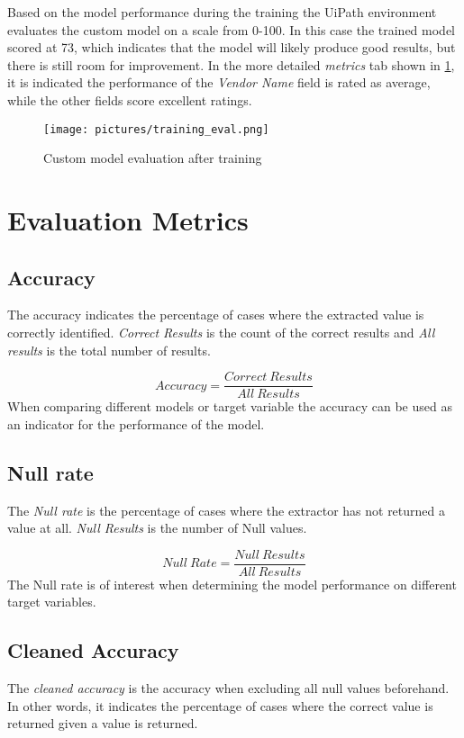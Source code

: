 Based on the model performance during the training the UiPath environment evaluates the custom model on a scale from 0-100. In this case the trained model scored at 73, which indicates that the model will likely produce good results, but there is still room for improvement. In the more detailed \textit{metrics} tab shown in \cref{fig:train-eval}, it is indicated the performance of the \textit{Vendor Name} field is rated as average, while the other fields score excellent ratings.

\begin{figure}
    \centering
    \texttt{[image: pictures/training\_eval.png]}
    \caption{Custom model evaluation after training}
    \label{fig:train-eval}
\end{figure}

\section{Evaluation Metrics}
\subsection{Accuracy}
The accuracy indicates the percentage of cases where the extracted value is correctly identified. \textit{Correct Results} is the count of the correct results and \textit{All results} is the total number of results.

\[ Accuracy = \frac{Correct \ Results}{All \ Results}\]
When comparing different models or target variable the accuracy can be used as an indicator for the performance of the model.
\subsection{Null rate}
The \textit{Null rate} is the percentage of cases where the extractor has not returned a value at all. \textit{Null Results} is the number of Null values.

\[ Null \ Rate = \frac{Null \ Results}{All \ Results}\]
The Null rate is of interest when determining the model performance on different target variables.
\subsection{Cleaned Accuracy}
The \textit{cleaned accuracy} is the accuracy when excluding all null values beforehand. In other words, it indicates the percentage of cases where the correct value is returned given a value is returned.

